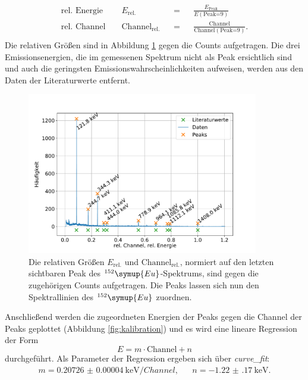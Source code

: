 \begin{align*}
	\text{rel. Energie } && E_{\text{rel.}} 				&& = && \frac{ E_{\text{Peak}} }{ E (\text{Peak=9}) } \\
	\text{rel. Channel } && \text{Channel}_{\text{rel.}} 	&& = && \frac{ \text{Channel} }{ \text{Channel} (\text{Peak=9}) }. \\
\end{align*}
Die relativen Größen sind in Abbildung \ref{fig:eu_kalibration} gegen die Counts aufgetragen.
Die drei Emissionsenergien, die im gemessenen Spektrum nicht als Peak ersichtlich sind und auch die geringsten Emissionswahrscheinlichkeiten aufweisen, werden aus den Daten der Literaturwerte entfernt.
\begin{figure}[h!]
  \centering
  \includegraphics[width=0.9\textwidth]{content/images/spektrum_europium_kali.pdf}
  \caption{Die relativen Größen $E_{\text{rel.}}$ und $\text{Channel}_{\text{rel.}}$, normiert auf den letzten sichtbaren Peak des $^{152}\symup{Eu}$-Spektrums, sind gegen die zugehörigen Counts aufgetragen.
  Die Peaks lassen sich nun den Spektrallinien des $^{152}\symup{Eu}$ zuordnen.}
  \label{fig:eu_kalibration}
\end{figure}
Anschließend werden die zugeordneten Energien der Peaks gegen die Channel der Peaks geplottet (Abbildung \ref{fig:kalibration}) und es wird eine lineare Regression der Form
\begin{equation}
	E = m \cdot \text{Channel} + n
\end{equation}
durchgeführt.
Als Parameter der Regression ergeben sich über \textit{curve\_fit}:
\begin{align*}
	m = \SI{0.20726(4)}{\kilo \electronvolt \per Channel}, && n = \SI{-1.22(17)}{\kilo \electronvolt}.
\end{align*}
